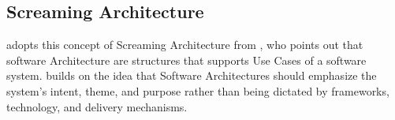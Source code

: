 \subsection{Screaming Architecture}

 adopts this concept of Screaming Architecture from
\textcite{jacobson_object-oriented_1992}, who points out that software Architecture are
structures that supports Use Cases of a software system.
\textcite[195]{robert_c_martin_clean_2018} builds on the idea that Software Architectures
should emphasize the system's intent, theme, and purpose rather than being dictated by
frameworks, technology, and delivery mechanisms.